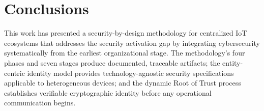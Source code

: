 \documentclass[preprint,12pt,authoryear]{elsarticle}
\begin{document}
\section{Conclusions}
\label{sec:conclusions}

This work has presented a security-by-design methodology for centralized IoT ecosystems that addresses the security activation gap by integrating cybersecurity systematically from the earliest organizational stage. The methodology's four phases and seven stages produce documented, traceable artifacts; the entity-centric identity model provides technology-agnostic security specifications applicable to heterogeneous devices; and the dynamic Root of Trust process establishes verifiable cryptographic identity before any operational communication begins.
\end{document}
